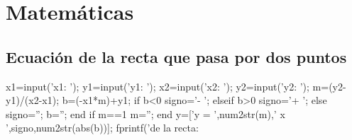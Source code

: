 \chapter{Matemáticas}

\section{Ecuación de la recta que pasa por dos puntos}


\begin{matlab}
x1=input('x1: ');
y1=input('y1: ');
x2=input('x2: ');
y2=input('y2: ');
m=(y2-y1)/(x2-x1);
b=(-x1*m)+y1;
if b<0
    signo='- ';
elseif b>0 
    signo='+ ';
else
    signo='';
    b='';
end 
if m==1
    m='';
end
y=['y = ',num2str(m),' x ',signo,num2str(abs(b))];
fprintf('\nEcuacion de la recta:  %
\end{matlab}